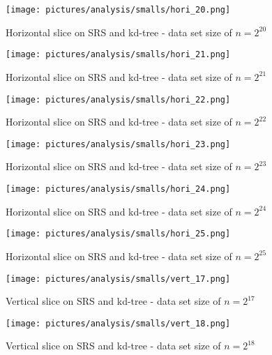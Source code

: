 \begin{figure}[h]
    \centering
    \texttt{[image: pictures/analysis/smalls/hori\_20.png]}
    \caption{Horizontal slice on SRS and kd-tree - data set size of $n=2^{20}$}\label{fig:small_hori_20}
\end{figure}

\begin{figure}[h]
    \centering
    \texttt{[image: pictures/analysis/smalls/hori\_21.png]}
    \caption{Horizontal slice on SRS and kd-tree - data set size of $n=2^{21}$}\label{fig:small_hori_21}
\end{figure}

\begin{figure}[h]
    \centering
    \texttt{[image: pictures/analysis/smalls/hori\_22.png]}
    \caption{Horizontal slice on SRS and kd-tree - data set size of $n=2^{22}$}\label{fig:small_hori_22}
\end{figure}

\begin{figure}[h]
    \centering
    \texttt{[image: pictures/analysis/smalls/hori\_23.png]}
    \caption{Horizontal slice on SRS and kd-tree - data set size of $n=2^{23}$}\label{fig:small_hori_23}
\end{figure}

\begin{figure}[h]
    \centering
    \texttt{[image: pictures/analysis/smalls/hori\_24.png]}
    \caption{Horizontal slice on SRS and kd-tree - data set size of $n=2^{24}$}\label{fig:small_hori_24}
\end{figure}

\begin{figure}[h]
    \centering
    \texttt{[image: pictures/analysis/smalls/hori\_25.png]}
    \caption{Horizontal slice on SRS and kd-tree - data set size of $n=2^{25}$}\label{fig:small_hori_25}
\end{figure}
\clearpage

\begin{figure}[h]
    \centering
    \texttt{[image: pictures/analysis/smalls/vert\_17.png]}
    \caption{Vertical slice on SRS and kd-tree - data set size of $n=2^{17}$}\label{fig:small_vert_17}
\end{figure}

\begin{figure}[h]
    \centering
    \texttt{[image: pictures/analysis/smalls/vert\_18.png]}
    \caption{Vertical slice on SRS and kd-tree - data set size of $n=2^{18}$}\label{fig:small_vert_18}
\end{figure}

